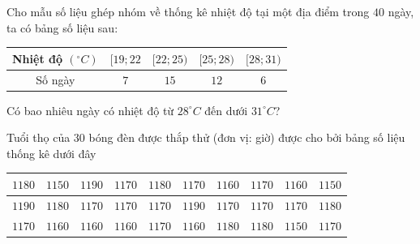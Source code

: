 \begin{ex}%
	Cho mẫu số liệu ghép nhóm  về thống kê nhiệt độ tại một địa điểm trong $40$ ngày, ta có bảng số liệu sau:
	\begin{center}
		\begin{tabular}{|c|c|c|c|c|}
			\hline 
			Nhiệt  độ $(^\circ C)$ & $[19{;}22$ & $[22{;}25)$ & $[25{;}28)$ & $[28{;}31)$ \\
			 \hline
			Số ngày & $7$  & $15$ & $12$ & $6$ \\
			 \hline
		\end{tabular}
	\end{center}
	Có bao nhiêu ngày  có nhiệt độ từ $28^\circ C$ đến dưới $31^\circ C$?
\end{ex}

\begin{bt}%
	Tuổi thọ của $30$ bóng đèn được thắp thử (đơn vị: giờ) được cho bởi bảng số liệu  thống kê dưới đây
	\begin{center}
		\begin{tabular}{|c|c|c|c|c|c|c|c|c|c|}
			 \hline
			$1180$ & $1150$ & $1190$ & $1170$ & $1180$ & $1170$ & $1160$ &  $1170$ & $1160$ & $1150$ \\
			 \hline
			$1190$ & $1180$ & $1170$ & $1170$ & $1170$ &  $1190$ & $1170$ & $1170$ & $1170$ & $1180$ \\
			\hline 
			$1170$ & $1160$ & $1160$  & $1160$ & $1170$ & $1160$ & $1180$ & $1180$ & $1150$ & $1170$ \\
			\hline 
		\end{tabular}
	\end{center}
\end{bt}


